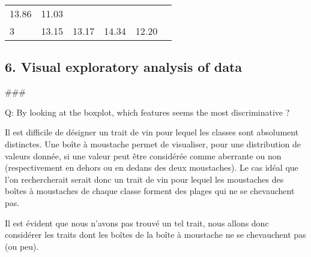 \documentclass[11pt]{article}
\begin{document}
\begin{longtable}[]{@{}llllll@{}}
\begin{minipage}[t]{0.06\columnwidth}
13.86\strut
\end{minipage} & \begin{minipage}[t]{0.06\columnwidth}\raggedright
11.03\strut
\end{minipage} & \begin{minipage}[t]{0.06\columnwidth}\raggedright
\strut
\end{minipage}\tabularnewline
\begin{minipage}[t]{0.27\columnwidth}\raggedright
3\strut
\end{minipage} & \begin{minipage}[t]{0.27\columnwidth}\raggedright
13.15\strut
\end{minipage} & \begin{minipage}[t]{0.10\columnwidth}\raggedright
13.17\strut
\end{minipage} & \begin{minipage}[t]{0.06\columnwidth}\raggedright
14.34\strut
\end{minipage} & \begin{minipage}[t]{0.06\columnwidth}\raggedright
12.20\strut
\end{minipage} & \begin{minipage}[t]{0.06\columnwidth}\raggedright
\strut
\end{minipage}\tabularnewline
\bottomrule
\end{longtable}

    \hypertarget{visual-exploratory-analysis-of-data}{%
\subsection{6. Visual exploratory analysis of
data}\label{visual-exploratory-analysis-of-data}}

    \#\#\#

Q: By looking at the boxplot, which features seems the most
discriminative ?

Il est difficile de désigner un trait de vin pour lequel les classes
sont absolument distinctes. Une boîte à moustache permet de visualiser,
pour une distribution de valeurs donnée, si une valeur peut être
considérée comme aberrante ou non (respectivement en dehors ou en dedans
des deux moustaches). Le cas idéal que l'on rechercherait serait donc un
trait de vin pour lequel les moustaches des boîtes à moustaches de
chaque classe forment des plages qui ne se chevauchent pas.

Il est évident que nous n'avons pas trouvé un tel trait, nous allons
donc considérer les traits dont les boîtes de la boîte à moustache ne se
chevauchent pas (ou peu).
\end{document}
